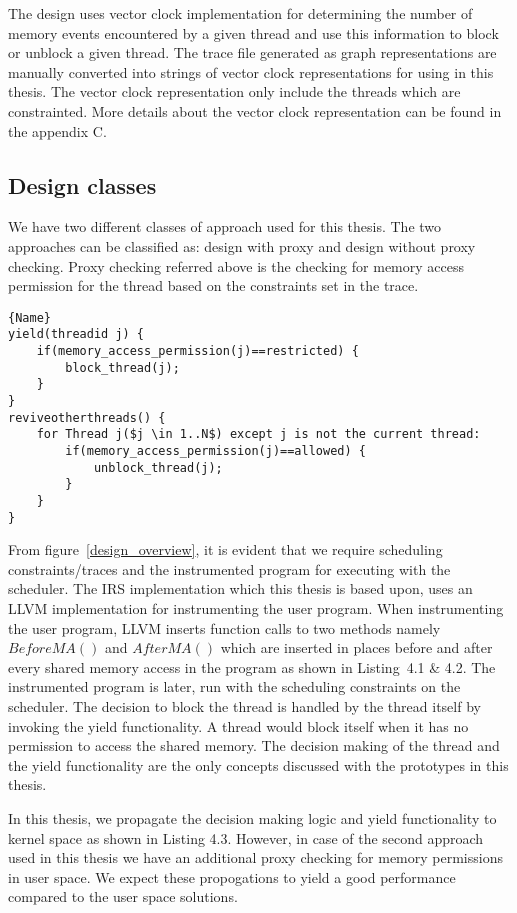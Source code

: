 The design uses vector clock implementation for determining the number of memory events encountered by a given thread and use this information to block or unblock a given thread. 
The trace file generated as graph representations are manually converted into strings of vector clock representations for using in this thesis. 
The vector clock representation only include the threads which are constrainted. 
More details about the vector clock representation can be found in the appendix C.


\subsection{Design classes}

We have two different classes of approach used for this thesis. 
The two approaches can be classified as: design with proxy and design without proxy checking. 
Proxy checking referred above is the checking for memory  access permission for the thread based on the constraints set in the trace. 

\begin{lstlisting}[mathescape=true,style=customc,caption=Yield functionality and thread revival,frame=tlrb]{Name}
yield(threadid j) {
	if(memory_access_permission(j)==restricted) {
		block_thread(j);
	}
}
reviveotherthreads() {
	for Thread j($j \in 1..N$) except j is not the current thread:
		if(memory_access_permission(j)==allowed) {
			unblock_thread(j);
		}	
	}
}
\end{lstlisting}
\label{yield_func}
From figure~\ref{design_overview}, it is evident that we require scheduling constraints/traces and the instrumented program for executing with the scheduler. 
The IRS implementation which this thesis is based upon, uses an LLVM implementation for instrumenting the user program. 
When instrumenting the user program, LLVM inserts function calls to two methods namely $BeforeMA()$ and $AfterMA()$ which are inserted in places before and after every shared memory access in the program as shown in Listing~4.1 \& 4.2. 
The instrumented program is later, run with the scheduling constraints on the scheduler. 
The decision to block the thread is handled by the thread itself by invoking the yield functionality. 
A thread would block itself when it has no permission to access the shared memory. 
The decision making of the thread and the yield functionality are the only concepts discussed with the prototypes in this thesis. 

In this thesis, we propagate the decision making logic and yield functionality to kernel space as shown in Listing 4.3. 
However, in case of the second approach used in this thesis we have an additional proxy checking for memory permissions in user space. 
We expect these propogations to yield a good performance compared to the user space solutions. 

